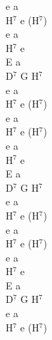 \documentclass[a5paper, 10pt]{book}
\begin{document}
\begin{minipage}[t]{0.18\textwidth}
e a\\
H$^7$ e (H$^7$)\\
e a\\
H$^7$ e\\
E a\\
D$^7$ G H$^7$\\
e a\\
H$^7$ e (H$^7$)\\

e a\\
H$^7$ e (H$^7$)\\
e a\\
H$^7$ e\\
E a\\
D$^7$ G H$^7$\\
e a\\
H$^7$ e (H$^7$)\\

e a\\
H$^7$ e (H$^7$)\\
e a\\
H$^7$ e\\
E a\\
D$^7$ G H$^7$\\
e a\\
H$^7$ e (H$^7$)\\
\end{minipage}

\newpage
\end{document}
